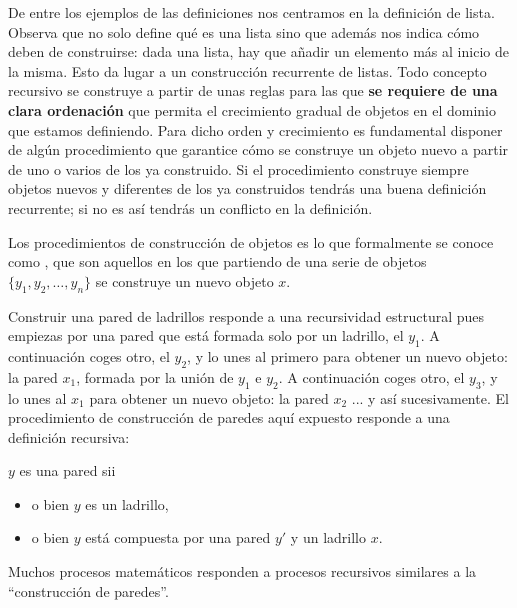De entre los ejemplos de las definiciones nos centramos en la definición de lista. Observa que no solo define qué es una lista sino que además nos indica cómo deben de construirse: dada una lista, hay que añadir un elemento más al inicio de la misma. Esto da lugar a un construcción recurrente de listas. Todo concepto recursivo se  construye a partir de unas reglas para las que {\bf se requiere de una clara ordenación} que permita el crecimiento gradual de objetos en el dominio que estamos definiendo. Para dicho orden y crecimiento es fundamental disponer de algún procedimiento que garantice cómo se construye un objeto nuevo a partir de uno o varios de los ya construido. Si el procedimiento construye siempre objetos nuevos y diferentes de los ya construidos tendrás una buena definición recurrente; si no es así tendrás un conflicto en la definición. 

Los procedimientos de construcción de objetos es lo que formalmente se conoce como , que son aquellos en los que partiendo de una serie de objetos $\{y_1, y_2, \ldots, y_n\}$ se construye un nuevo objeto $x$.


\begin{ejemplo}
Construir una pared de ladrillos responde a una recursividad estructural pues empiezas por una pared que está formada solo por un ladrillo, el
$y_1$.  A continuación coges otro, el $y_2$, y lo unes al primero para
obtener un nuevo objeto: la pared $x_1$, formada por la unión de $y_1$ e
$y_2$. A continuación coges otro, el $y_3$, y lo unes al $x_1$ para
obtener un nuevo objeto: la pared  $x_2$ ... y así sucesivamente. El procedimiento de construcción de paredes aquí expuesto responde a una definición recursiva:

\noindent $y$ es una pared sii
\begin{itemize}
\item o bien $y$ es un ladrillo,
\item o bien $y$ está compuesta por una pared $y'$ y un ladrillo $x$.
\end{itemize}
\end{ejemplo}


\vspace{0.5cm}
Muchos procesos matemáticos responden a procesos recursivos similares a la ``construcción de paredes''.

